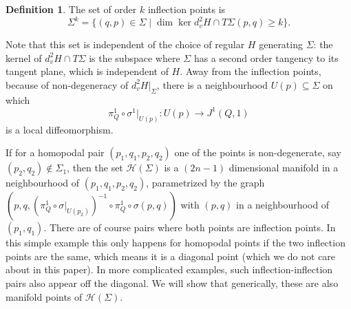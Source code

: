 \documentclass{amsart}
\newcommand{\Hcal}{{\mathcal{H}}}
\newtheorem{conjecture}[proposition]{Conjecture}
\theoremstyle{definition}
\newtheorem{definition}[proposition]{Definition}
\theoremstyle{remark}
\numberwithin{equation}{section}
\begin{document}
\begin{definition}\label{def:inflectionPoints}
    The set of order $k$ inflection points is
    $$\Sigma^k=\{(q,p)\in \Sigma\mid \dim\ker d_v^2H\cap T\Sigma(p,q)\geq k\}.$$
\end{definition}

Note that this set is independent of the choice of regular $H$ generating $\Sigma$: the kernel of $d^2_vH\cap T\Sigma$ is the subspace where $\Sigma$ has a second order tangency to its tangent plane, which is independent of $H$. Away from the inflection points, because of non-degeneracy of $d^2_vH|_\Sigma$, there is a neighbourhood $U(p)\subseteq \Sigma$ on which 
$$\pi^1_Q\circ \sigma^1|_{U(p)}:U(p)\to J^1(Q,1)$$ 
is a local diffeomorphism. 

If for a homopodal pair $(p_1,q_1,p_2,q_2)$ one of the points is non-degenerate, say $(p_2,q_2)\notin\Sigma_1$, then the set $\Hcal(\Sigma)$ is a $(2n-1)$ dimensional manifold in a neighbourhood of $(p_1,q_1,p_2,q_2)$, parametrized by the graph $(p,q, (\pi^1_Q\circ \sigma|_{U(p_2)})^{-1}\circ\pi^1_Q\circ \sigma(p,q))$ with $(p,q)$ in a neighbourhood of $(p_1,q_1)$. 
There are of course pairs where both points are inflection points. In this simple example this only happens for homopodal points if the two inflection points are the same, which means it is a diagonal point (which we do not care about in this paper). In more complicated examples, such inflection-inflection pairs also appear off the diagonal. We will show that generically, these are also manifold points of $\Hcal(\Sigma)$. 





\end{document}
